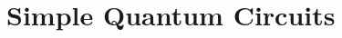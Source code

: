 \documentclass[twocolumn,nofootinbib,aps,,pra]{revtex4-1}
\begin{document}
%

\section{Simple Quantum Circuits\label{S:basics}}
\end{document}
